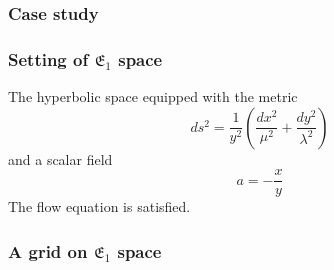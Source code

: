 \documentclass[aspectratio=169]{beamer}
\begin{document}
\begin{frame}
    \frametitle{Case study}
    \begin{figure}[ht]\centering
    \end{figure}
\end{frame}

\begin{frame}
    \frametitle{Setting of $\mathfrak{E}_1$ space}
    The hyperbolic space equipped with the metric
    \[
        ds^2 = \frac{1}{y^2}(\frac{dx^2}{\mu^2} + \frac{dy^2}{\lambda^2})
    \]
    and a scalar field
    \[
        a = - \frac{x}{y}
    \]
    The flow equation is satisfied.
\end{frame}

\begin{frame}
    \frametitle{A grid on $\mathfrak{E}_1$ space}
    \begin{figure}[ht]\centering
    \end{figure}
\end{frame}
\end{document}

